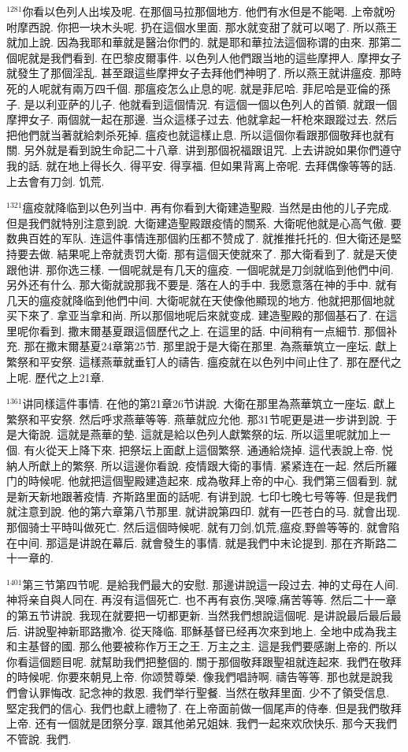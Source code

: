 \documentclass{book}
\begin{document}
$^{1281}$你看以色列人出埃及呢.
在那個马拉那個地方.
他們有水但是不能喝.
上帝就吩咐摩西說.
你把一块木头呢.
扔在這個水里面.
那水就变甜了就可以喝了.
所以燕王就加上說.
因為我耶和華就是醫治你們的.
就是耶和華拉法這個称谓的由來.
那第二個呢就是我們看到.
在巴黎皮爾事件.
以色列人他們跟当地的這些摩押人.
摩押女子就發生了那個淫乱.
甚至跟這些摩押女子去拜他們神明了.
所以燕王就讲瘟疫.
那時死的人呢就有兩万四千個.
那瘟疫怎么止息的呢.
就是菲尼哈.
菲尼哈是亚倫的孫子.
是以利亚萨的儿子.
他就看到這個情況.
有這個一個以色列人的首領.
就跟一個摩押女子.
兩個就一起在那邊.
当众這樣子过去.
他就拿起一杆枪來跟蹤过去.
然后把他們就当著就給刺杀死掉.
瘟疫也就這樣止息.
所以這個你看跟那個敬拜也就有關.
另外就是看到說生命記二十八章.
讲到那個祝福跟诅咒.
上去讲說如果你們遵守我的話.
就在地上得长久.
得平安.
得享福.
但如果背离上帝呢.
去拜偶像等等的話.
上去會有刀剑.
饥荒.

$^{1321}$瘟疫就降临到以色列当中.
再有你看到大衛建造聖殿.
当然是由他的儿子完成.
但是我們就特別注意到說.
大衛建造聖殿跟疫情的關系.
大衛呢他就是心高气傲.
要数典百姓的军队.
连這件事情连那個約压都不赞成了.
就推推托托的.
但大衛还是堅持要去做.
結果呢上帝就责罚大衛.
那有這個天使就來了.
那大衛看到了.
就是天使跟他讲.
那你选三樣.
一個呢就是有几天的瘟疫.
一個呢就是刀剑就临到他們中间.
另外还有什么.
那大衛就說那我不要是.
落在人的手中.
我愿意落在神的手中.
就有几天的瘟疫就降临到他們中间.
大衛呢就在天使像他顯现的地方.
他就把那個地就买下來了.
拿亚当拿和尚.
所以那個地呢后來就变成.
建造聖殿的那個基石了.
在這里呢你看到.
撒末爾基夏跟這個歷代之上.
在這里的話.
中间稍有一点細节.
那個补充.
那在撒末爾基夏24章第25节.
那里說于是大衛在那里.
為燕華筑立一座坛.
獻上繁祭和平安祭.
這樣燕華就垂钉人的禱告.
瘟疫就在以色列中间止住了.
那在歷代之上呢.
歷代之上21章.

$^{1361}$讲同樣這件事情.
在他的第21章26节讲說.
大衛在那里為燕華筑立一座坛.
獻上繁祭和平安祭.
然后呼求燕華等等.
燕華就应允他.
那31节呢更是进一步讲到說.
于是大衛說.
這就是燕華的墊.
這就是給以色列人獻繁祭的坛.
所以這里呢就加上一個.
有火從天上降下來.
把祭坛上面獻上這個繁祭.
通通給烧掉.
這代表說上帝.
悦納人所獻上的繁祭.
所以這邊你看說.
疫情跟大衛的事情.
紧紧连在一起.
然后所羅门的時候呢.
他就把這個聖殿建造起來.
成為敬拜上帝的中心.
我們第三個看到.
就是新天新地跟著疫情.
齐斯路里面的話呢.
有讲到說.
七印七晚七号等等.
但是我們就注意到說.
他的第六章第八节那里.
就讲說第四印.
就有一匹苍白的马.
就會出现.
那個骑士平時叫做死亡.
然后這個時候呢.
就有刀剑,饥荒,瘟疫,野兽等等的.
就會陷在中间.
那這是讲說在幕后.
就會發生的事情.
就是我們中末论提到.
那在齐斯路二十一章的.

$^{1401}$第三节第四节呢.
是給我們最大的安慰.
那邊讲說這一段过去.
神的丈母在人间.
神将亲自與人同在.
再沒有這個死亡.
也不再有哀伤,哭嚎,痛苦等等.
然后二十一章的第五节讲說.
我现在就要把一切都更新.
当然我們想說這個呢.
是讲說最后最后最后.
讲說聖神新耶路撒冷.
從天降临.
耶穌基督已经再次來到地上.
全地中成為我主和主基督的國.
那么他要被称作万王之王.
万主之主.
這是我們要感謝上帝的.
所以你看這個题目呢.
就幫助我們把整個的.
關于那個敬拜跟聖祖就连起來.
我們在敬拜的時候呢.
你要來朝見上帝.
你颂赞尊榮.
像我們唱詩啊.
禱告等等.
那也就是說我們會认罪悔改.
記念神的救恩.
我們举行聖餐.
当然在敬拜里面.
少不了領受信息.
堅定我們的信心.
我們也獻上禮物了.
在上帝面前做一個尾声的侍奉.
但是我們敬拜上帝.
还有一個就是团祭分享.
跟其他弟兄姐妹.
我們一起來欢欣快乐.
那今天我們不管說.
我們.
\end{document}
